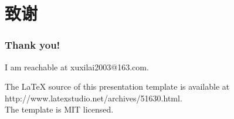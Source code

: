 \documentclass[aspectratio=169]{beamer}
\begin{document}
\section{致谢}
 \begin{frame}
 \frametitle{Thank you!}
 I am reachable at xuxilai2003@163.com.\vspace{1em}
 
 \tiny The \LaTeX\hspace{0.01em} source of this presentation template is available at http://www.latexstudio.net/archives/51630.html.\\
 The template is MIT licensed.
\end{frame}
 
 
\end{document}
